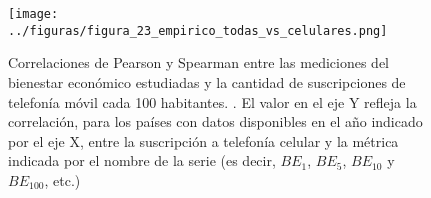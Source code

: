 \begin{figure}[H] %
    \centering %
    \texttt{[image: ../figuras/figura\_23\_empirico\_todas\_vs\_celulares.png]} %
    \caption{Correlaciones de Pearson y Spearman entre las mediciones del bienestar económico estudiadas y la cantidad de suscripciones de telefonía móvil cada 100 habitantes. \cite{worldbank_gender_data}. El valor en el eje Y refleja la correlación, para los países con datos disponibles en el año indicado por el eje X, entre la suscripción a telefonía celular y la métrica indicada por el nombre de la serie (es decir, $BE_1$, $BE_5$, $BE_{10}$ y $BE_{100}$, etc.)}
    \label{fig:23} %
\end{figure}